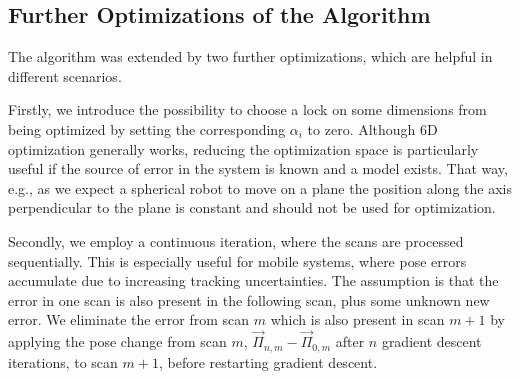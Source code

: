 \subsection{Further Optimizations of the Algorithm}

The algorithm was extended by two further optimizations, which are helpful in different scenarios.

Firstly, we introduce the possibility to choose a lock on some dimensions from being optimized by setting the corresponding $\alpha_i$ to zero.
Although 6D optimization generally works, reducing the optimization space is particularly useful if the source of error in the system is known and a model exists.
That way, e.g., as we expect a spherical robot to move on a plane the position along the axis perpendicular to the plane is constant and should not be used for optimization. 

Secondly, we employ a continuous iteration, where the scans are processed sequentially. 
This is especially useful for mobile systems, where pose errors accumulate due to increasing tracking uncertainties.
The assumption is that the error in one scan is also present in the following scan, plus some unknown new error.
We eliminate the error from scan $m$ which is also present in scan $m+1$ by applying the pose change from scan $m$, $\vec{\Pi}_{n,m} - \vec{\Pi}_{0,m}$ after $n$ gradient descent iterations, to scan $m+1$, before restarting gradient descent.
